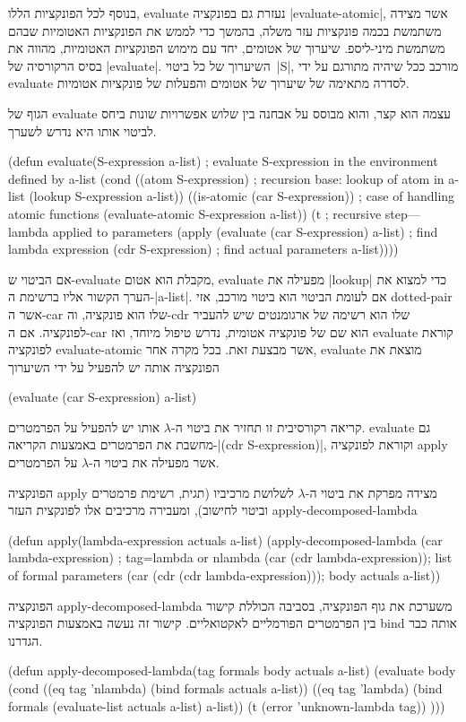 בנוסף לכל הפונקציות הללו, evaluate נעזרת גם בפונקציה \E|evaluate-atomic|, אשר
מצידה משתמשת בכמה פונקציות עזר משלה, בהמשך כדי לממש את הפונקציות האטומיות שבהם
משתמשת מיני-ליספ. שיערוך של אטומים, יחד עם מימוש הפונקציות האטומיות, מהווה את
בסיס הרקורסיה של \E|evaluate|. השיערוך של כל ביטוי~\E|S|, מורכב ככל שיהיה
מתורגם על ידי evaluate לסדרה מתאימה של שיערוך של אטומים והפעלות של פונקציות
אטומיות.

הגוף של evaluate עצמה הוא קצר, והוא מבוסס על אבחנה בין שלוש אפשרויות שונות ביחס
לביטוי אותו היא נדרש לשערך.

\minipage\textwidth
\begin{KERNEL}
(defun evaluate(S-expression a-list) ; evaluate S-expression in the environment defined by a-list
  (cond ((atom S-expression) ; recursion base: lookup of atom in a-list
          (lookup S-expression a-list))
        ((is-atomic (car S-expression)) ; case of handling atomic functions
          (evaluate-atomic S-expression a-list))
        (t ; recursive step---lambda applied to parameters
          (apply (evaluate (car S-expression) a-list) ; find lambda expression
                  (cdr S-expression) ; find actual parameters
                  a-list))))
\end{KERNEL}
\endminipage

אם הביטוי ש-evaluate מקבלת הוא אטום, evaluate מפעילה את \E|lookup| כדי למצוא את
הערך הקשור אליו ברשימת ה-\E|a-list|. אם לעומת הביטוי הוא ביטוי מורכב, אזי
dotted-pair אשר ה-car שלו הוא פונקציה, וה-cdr שלו הוא רשימה של
ארגומנטים שיש להעביר לפונקציה. אם ה-car הוא שם של פונקציה אטומית, נדרש טיפול
מיוחד, ואז evaluate קוראת לפונקציה evaluate-atomic אשר מבצעת זאת.
בכל מקרה אחר, evaluate מוצאת את הפונקציה אותה יש להפעיל על ידי השיערוך
\begin{LISP}
(evaluate (car S-expression) a-list)
\end{LISP}
קריאה רקורסיבית זו תחזיר את ביטוי ה-$λ$ אותו יש להפעיל על הפרמטרים. evaluate
גם מחשבת את הפרמטרים באמצעות הקריאה-\T|(cdr S-expression)|, וקוראת לפונקציה
apply אשר מפעילה את ביטוי ה-$λ$ על הפרמטרים.

הפונקציה apply מצידה מפרקת את ביטוי ה-$λ$ לשלושת מרכיביו (תגית, רשימת פרמטרים
וביטוי לחישוב), ומעבירה מרכיבים אלו לפונקצית העזר apply-decomposed-lambda
\begin{KERNEL}
(defun apply(lambda-expression actuals a-list)
  (apply-decomposed-lambda
    (car lambda-expression) ; tag=lambda or nlambda
    (car (cdr lambda-expression)); list of formal parameters
    (car (cdr (cdr lambda-expression))); body
    actuals
    a-list))
\end{KERNEL}
הפונקציה apply-decomposed-lambda משערכת את גוף הפונקציה, בסביבה הכוללת קישור בין
הפרמטרים הפורמליים לאקטואליים. קישור זה נעשה באמצעות הפונקציה bind אותה כבר
הגדרנו.
\begin{KERNEL}
(defun apply-decomposed-lambda(tag formals body actuals a-list)
  (evaluate body
    (cond ((eq tag 'nlambda) (bind formals actuals a-list))
          ((eq tag 'lambda) (bind formals (evaluate-list actuals a-list) a-list))
          (t (error 'unknown-lambda tag))
)))
\end{KERNEL}

